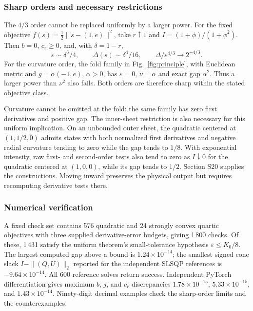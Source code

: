 \documentclass[pdflatex,sn-mathphys-num]{sn-jnl}
\begin{document}
\subsubsection{Sharp orders and necessary restrictions}
The $4/3$ order cannot be replaced uniformly by a larger power. For the fixed objective $f(s)=\tfrac12\|s-(1,e)\|^2$, take $r\uparrow1$ and $I=(1+\phi)/(1+\phi^2)$. Then $b=0$, $c_r\ge0$, and, with $\delta=1-r$,
\begin{equation}
 \varepsilon\sim\delta^3/4,\qquad
 \Delta(s)\sim\delta^4/16,\qquad
 \Delta/\varepsilon^{4/3}\to2^{-4/3}.
 \label{eq:stopsharpfirst}
\end{equation}
For the curvature order, the fold family in Fig.~\ref{fig:principle}, with Euclidean metric and $g=\alpha(-1,e)$, $\alpha>0$, has $\varepsilon=0$, $\nu=\alpha$ and exact gap $\alpha^2$. Thus a larger power than $\nu^2$ also fails. Both orders are therefore sharp within the stated objective class.

Curvature cannot be omitted at the fold: the same family has zero first derivatives and positive gap. The inner-sheet restriction is also necessary for this uniform implication. On an unbounded outer sheet, the quadratic centered at $(1,1/2,0)$ admits states with both normalized first derivatives and negative radial curvature tending to zero while the gap tends to $1/8$. With exponential intensity, raw first- and second-order tests also tend to zero as $I\downarrow0$ for the quadratic centered at $(1,0,0)$, while its gap tends to $1/2$. Section S20 supplies the constructions. Moving inward preserves the physical output but requires recomputing derivative tests there.

\subsubsection{Numerical verification}
A fixed check set contains 576 quadratic and 24 strongly convex quartic objectives with three supplied derivative-error budgets, giving 1\,800 checks. Of these, 1\,431 satisfy the uniform theorem's small-tolerance hypothesis $\varepsilon\le K_0/8$. The largest computed gap above a bound is $1.24\times10^{-14}$; the smallest signed cone slack $I-\|(Q,U)\|_2$ reported for the independent SLSQP references is $-9.64\times10^{-14}$. All 600 reference solves return success. Independent PyTorch differentiation gives maximum $b$, $j$, and $c_r$ discrepancies $1.78\times10^{-15}$, $5.33\times10^{-15}$, and $1.43\times10^{-14}$. Ninety-digit decimal examples check the sharp-order limits and the counterexamples.
\end{document}
